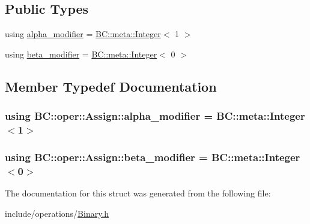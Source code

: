 \subsection*{Public Types}
\begin{DoxyCompactItemize}
\item 
using \hyperlink{structBC_1_1oper_1_1Assign_a5b56dd2f402c432d85467dfcc568135e}{alpha\+\_\+modifier} = \hyperlink{structBC_1_1meta_1_1Integer}{B\+C\+::meta\+::\+Integer}$<$ 1 $>$
\item 
using \hyperlink{structBC_1_1oper_1_1Assign_a97c21e6ead4f60ed53836a0817377754}{beta\+\_\+modifier} = \hyperlink{structBC_1_1meta_1_1Integer}{B\+C\+::meta\+::\+Integer}$<$ 0 $>$
\end{DoxyCompactItemize}


\subsection{Member Typedef Documentation}
\subsubsection[{\texorpdfstring{alpha\+\_\+modifier}{alpha_modifier}}]{\setlength{\rightskip}{0pt plus 5cm}using {\bf B\+C\+::oper\+::\+Assign\+::alpha\+\_\+modifier} =  {\bf B\+C\+::meta\+::\+Integer}$<$1$>$}\hypertarget{structBC_1_1oper_1_1Assign_a5b56dd2f402c432d85467dfcc568135e}{}\label{structBC_1_1oper_1_1Assign_a5b56dd2f402c432d85467dfcc568135e}
\subsubsection[{\texorpdfstring{beta\+\_\+modifier}{beta_modifier}}]{\setlength{\rightskip}{0pt plus 5cm}using {\bf B\+C\+::oper\+::\+Assign\+::beta\+\_\+modifier} =  {\bf B\+C\+::meta\+::\+Integer}$<$0$>$}\hypertarget{structBC_1_1oper_1_1Assign_a97c21e6ead4f60ed53836a0817377754}{}\label{structBC_1_1oper_1_1Assign_a97c21e6ead4f60ed53836a0817377754}


The documentation for this struct was generated from the following file\+:\begin{DoxyCompactItemize}
\item 
include/operations/\hyperlink{Binary_8h}{Binary.\+h}\end{DoxyCompactItemize}
